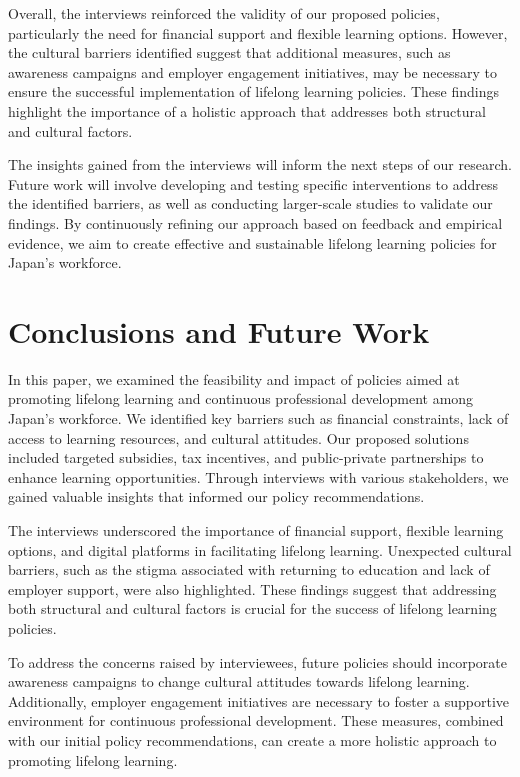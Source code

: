 \documentclass{article} %
\begin{document}
Overall, the interviews reinforced the validity of our proposed policies, particularly the need for financial support and flexible learning options. However, the cultural barriers identified suggest that additional measures, such as awareness campaigns and employer engagement initiatives, may be necessary to ensure the successful implementation of lifelong learning policies. These findings highlight the importance of a holistic approach that addresses both structural and cultural factors.

The insights gained from the interviews will inform the next steps of our research. Future work will involve developing and testing specific interventions to address the identified barriers, as well as conducting larger-scale studies to validate our findings. By continuously refining our approach based on feedback and empirical evidence, we aim to create effective and sustainable lifelong learning policies for Japan's workforce.

\section{Conclusions and Future Work}
\label{sec:conclusion}

In this paper, we examined the feasibility and impact of policies aimed at promoting lifelong learning and continuous professional development among Japan's workforce. We identified key barriers such as financial constraints, lack of access to learning resources, and cultural attitudes. Our proposed solutions included targeted subsidies, tax incentives, and public-private partnerships to enhance learning opportunities. Through interviews with various stakeholders, we gained valuable insights that informed our policy recommendations.

The interviews underscored the importance of financial support, flexible learning options, and digital platforms in facilitating lifelong learning. Unexpected cultural barriers, such as the stigma associated with returning to education and lack of employer support, were also highlighted. These findings suggest that addressing both structural and cultural factors is crucial for the success of lifelong learning policies.

To address the concerns raised by interviewees, future policies should incorporate awareness campaigns to change cultural attitudes towards lifelong learning. Additionally, employer engagement initiatives are necessary to foster a supportive environment for continuous professional development. These measures, combined with our initial policy recommendations, can create a more holistic approach to promoting lifelong learning.
\end{document}
